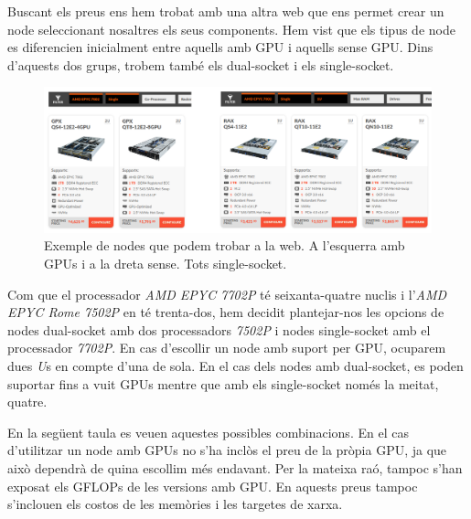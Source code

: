 Buscant els preus ens hem trobat amb una altra web \cite{webnodes} que ens permet crear un node seleccionant nosaltres els seus components. Hem vist que els tipus de node es diferencien inicialment entre aquells amb GPU i aquells sense GPU. Dins d'aquests dos grups, trobem també els dual-socket i els single-socket.

\begin{figure}[h]
    \centering
    \includegraphics[width=\textwidth]{img/webnodes.png}
    \caption{Exemple de nodes que podem trobar a la web. A l'esquerra amb GPUs i a la dreta sense. Tots single-socket.}
\end{figure}

Com que el processador \textit{AMD EPYC 7702P} té seixanta-quatre nuclis i l'\textit{AMD EPYC Rome 7502P} en té trenta-dos, hem decidit plantejar-nos les opcions de nodes dual-socket amb dos processadors \textit{7502P} i nodes single-socket amb el processador \textit{7702P}. En cas d'escollir un node amb suport per GPU, ocuparem dues \textit{U}s en compte d'una de sola. En el cas dels nodes amb dual-socket, es poden suportar fins a vuit GPUs mentre que amb els single-socket només la meitat, quatre.

 En la següent taula es veuen aquestes possibles combinacions. En el cas d'utilitzar un node amb GPUs no s'ha inclòs el preu de la pròpia GPU, ja que això dependrà de quina escollim més endavant. Per la mateixa raó, tampoc s'han exposat els GFLOPs de les versions amb GPU. En aquests preus tampoc s'inclouen els costos de les memòries i les targetes de xarxa.

